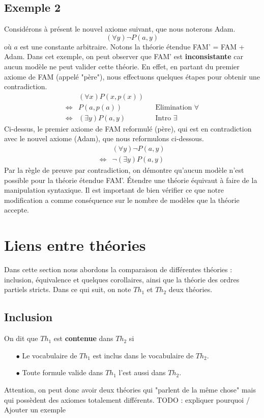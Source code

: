\subsection*{Exemple 2}
Considérons à présent le nouvel axiome suivant, que nous noterons Adam.
$$ (\forall y) \neg P(a,y) $$
où $a$ est une constante arbitraire. Notons la théorie étendue FAM' = FAM + Adam. Dans cet exemple, on peut observer que FAM' est \textbf{inconsistante} car aucun modèle ne peut valider cette théorie. En effet, en partant du premier axiome de FAM (appelé "père"), nous effectuons quelques étapes pour obtenir une contradiction.
\begin{align*}
& (\forall x) P(x,p(x)) \\
\iff & P(a,p(a)) && \textrm{Elimination } \forall \\
\iff & (\exists y) P(a,y) && \textrm{Intro } \exists
\end{align*}
Ci-dessus, le premier axiome de FAM reformulé (père), qui est en contradiction avec le nouvel axiome (Adam), que nous reformulons ci-dessous.
\begin{align*}
& (\forall y) \neg P(a,y) \\
\iff & \neg (\exists y) P(a,y)
\end{align*}
Par la règle de preuve par contradiction, on démontre qu'aucun modèle n'est possible pour la théorie étendue FAM'. \'{E}tendre une théorie équivaut à faire de la manipulation syntaxique. Il est important de bien vérifier ce que notre modification a comme conséquence sur le nombre de modèles que la théorie accepte.

\section{Liens entre théories}
Dans cette section nous abordons la comparaison de différentes théories : inclusion, équivalence et quelques corollaires, ainsi que la théorie des ordres partiels stricts. Dans ce qui suit, on note $Th_1$ et $Th_2$ deux théories.

\subsection*{Inclusion}
On dit que $Th_1$ est \textbf{contenue} dans $Th_2$ si
\begin{itemize}
\item[$\bullet$] Le vocabulaire de $Th_1$ est inclus dans le vocabulaire de $Th_2$.
\item[$\bullet$] Toute formule valide dans $Th_1$ l'est aussi dans $Th_2$.
\end{itemize}
Attention, on peut donc avoir deux théories qui "parlent de la même chose" mais qui possèdent des axiomes totalement différents.
TODO : expliquer pourquoi / Ajouter un exemple

